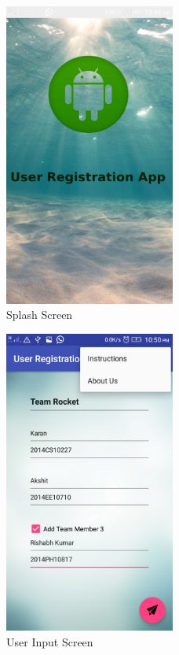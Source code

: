 \documentclass[12pt,a4paper,titlepage]{article}
\begin{document}
\begin{figure}[!ht]
	\centering
	\includegraphics[width=0.5\textwidth]{./UserInterface}
	\caption{Splash Screen}
\end{figure}
\begin{figure}[!ht]
	\centering
	\includegraphics[width=0.5\textwidth]{./screen_main}
	\caption{User Input Screen}
\end{figure}
\end{document}

